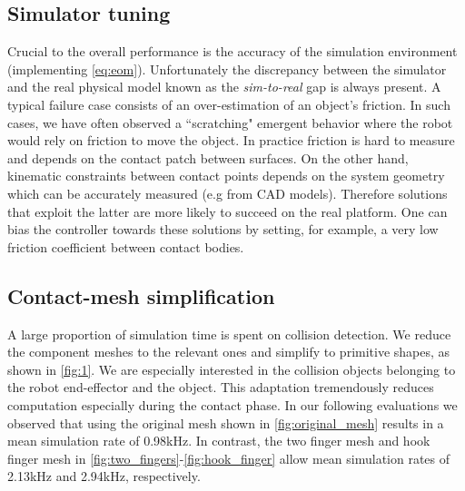 \subsection{Simulator tuning}
Crucial to the overall performance is the accuracy of the simulation environment (implementing \eqn \ref{eq:eom}). Unfortunately the discrepancy between the simulator and the real physical model known as the \emph{sim-to-real} gap is always present. A typical failure case consists of an over-estimation of an object's friction. In such cases, we have often observed a ``scratching" emergent behavior where the robot would rely on friction to move the object. In practice friction is hard to measure and depends on the contact patch between surfaces. On the other hand, kinematic constraints between contact points depends on the system geometry which can be accurately measured (e.g from CAD models). Therefore solutions that exploit the latter are more likely to succeed on the real platform. One can bias the controller towards these solutions by setting, for example, a very low friction coefficient between contact bodies.

\subsection{Contact-mesh simplification}
A large proportion of simulation time is spent on collision detection. We reduce the component meshes to the relevant ones and simplify to primitive shapes, as shown in \fig\ref{fig:1}. We are especially interested in the collision objects belonging to the robot end-effector and the object. This adaptation tremendously reduces computation especially during the contact phase. In our following evaluations we observed that using the original mesh shown in \fig\ref{fig:original_mesh} results in a mean simulation rate of 0.98kHz. In contrast, the two finger mesh and hook finger mesh in \fig\ref{fig:two_fingers}-\ref{fig:hook_finger} allow mean simulation rates of 2.13kHz and 2.94kHz, respectively.

